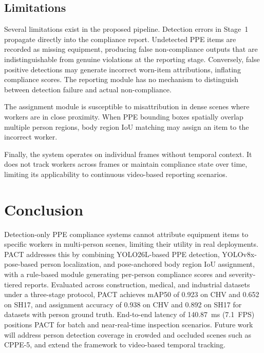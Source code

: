 \documentclass[conference]{IEEEtran}
\begin{document}
\subsection{Limitations}
Several limitations exist in the proposed pipeline. Detection errors in Stage~1 propagate directly into the compliance report. Undetected PPE items are recorded as missing equipment, producing false non-compliance outputs that are indistinguishable from genuine violations at the reporting stage. Conversely, false positive detections may generate incorrect worn-item attributions, inflating compliance scores. The reporting module has no mechanism to distinguish between detection failure and actual non-compliance.

The assignment module is susceptible to misattribution in dense scenes where workers are in close proximity. When PPE bounding boxes spatially overlap multiple person regions, body region IoU matching may assign an item to the incorrect worker.

Finally, the system operates on individual frames without temporal context. It does not track workers across frames or maintain compliance state over time, limiting its applicability to continuous video-based reporting scenarios.



\section{Conclusion}
Detection-only PPE compliance systems cannot attribute equipment items to specific workers in multi-person scenes, limiting their utility in real deployments. PACT addresses this by combining YOLO26L-based PPE detection, YOLOv8x-pose-based person localization, and pose-anchored body region IoU assignment, with a rule-based module generating per-person compliance scores and severity-tiered reports. Evaluated across construction, medical, and industrial datasets under a three-stage protocol, PACT achieves mAP50 of 0.923 on CHV and 0.652 on SH17, and assignment accuracy of 0.938 on CHV and 0.892 on SH17 for datasets with person ground truth. End-to-end latency of 140.87~ms (7.1~FPS) positions PACT for batch and near-real-time inspection scenarios. Future work will address person detection coverage in crowded and occluded scenes such as CPPE-5, and extend the framework to video-based temporal tracking.




\end{document}
